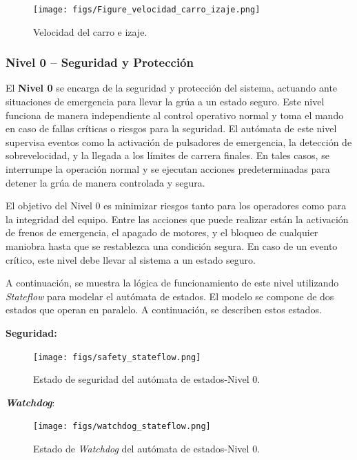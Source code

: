\documentclass{article}
\begin{document}
            \begin{figure}[H]
                \centering
                \texttt{[image: figs/Figure\_velocidad\_carro\_izaje.png]}
                \caption{Velocidad del carro e izaje.}
                \label{fig:velocidad_carro_izaje}
            \end{figure}


            \subsubsection{Nivel 0 – Seguridad y Protección}

            El \textbf{Nivel 0} se encarga de la seguridad y protección del sistema, actuando ante situaciones de emergencia para llevar la grúa a un estado seguro. Este nivel funciona de manera independiente al control operativo normal y toma el mando en caso de fallas críticas o riesgos para la seguridad. El autómata de este nivel supervisa eventos como la activación de pulsadores de emergencia, la detección de sobrevelocidad, y la llegada a los límites de carrera finales. En tales casos, se interrumpe la operación normal y se ejecutan acciones predeterminadas para detener la grúa de manera controlada y segura.
            
            El objetivo del Nivel 0 es minimizar riesgos tanto para los operadores como para la integridad del equipo. Entre las acciones que puede realizar están la activación de frenos de emergencia, el apagado de motores, y el bloqueo de cualquier maniobra hasta que se restablezca una condición segura. En caso de un evento crítico, este nivel debe llevar al sistema a un estado seguro.

            A continuación, se muestra la lógica de funcionamiento de este nivel utilizando \textit{Stateflow} para modelar el autómata de estados. El modelo se compone de dos estados que operan en paralelo. A continuación, se describen estos estados.

            \textbf{Seguridad:}
            \begin{figure} [H]
                \centering
                \texttt{[image: figs/safety\_stateflow.png]}
                \caption{Estado de seguridad del autómata de estados-Nivel 0.}
                \label{fig:safety_stateflow}
            \end{figure}

            \textbf{\textit{Watchdog}}:
            \begin{figure} [H]
                \centering
                \texttt{[image: figs/watchdog\_stateflow.png]}
                \caption{Estado de \textit{Watchdog} del autómata de estados-Nivel 0.}
                \label{fig:watchdog_stateflow}
            \end{figure}
\end{document}
